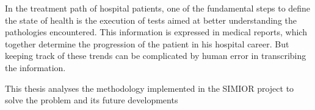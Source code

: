 \vspace{4cm}
In the treatment path of hospital patients, one of the fundamental steps to define the state of health is the execution of tests aimed at better understanding the pathologies encountered.
This information is expressed in medical reports, which together determine the progression of the patient in his hospital career.
But keeping track of these trends can be complicated by human error in transcribing the information.
\par\bigskip
This thesis analyses the methodology implemented in the SIMIOR project to solve the problem and its future developments

